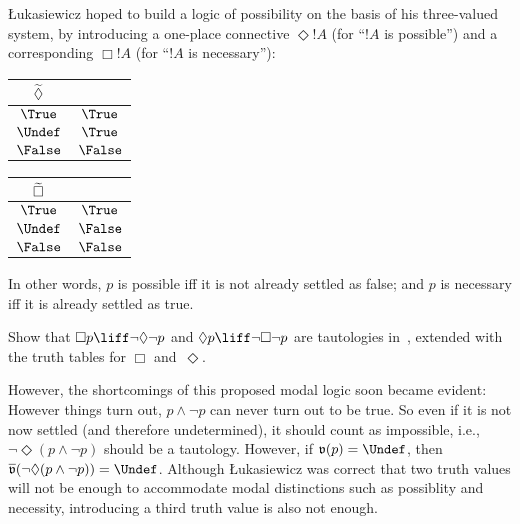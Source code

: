 \documentclass[../../../include/open-logic-section]{subfiles}
\begin{document}
\L ukasiewicz hoped to build a logic of possibility on the basis of his
three-valued system, by introducing a one-place connective $\Diamond
!A$ (for ``$!A$ is possible'') and a corresponding $\Box !A$ (for ``$!A$
is necessary''):
\begin{center}
  \begin{tabular}{c|c} 
    $\tf{\Diamond}$ & \\ 
    \hline  
    $\True$ & $\True$ \\ 
    $\Undef$ & $\True$ \\
    $\False$ & $\False$ 
  \end{tabular}
  \quad
  \begin{tabular}{c|c} 
    $\tf{\Box}$ & \\ 
    \hline  
    $\True$ & $\True$ \\ 
    $\Undef$ & $\False$ \\
    $\False$ & $\False$ 
  \end{tabular}
\end{center}
In other words, $p$ is possible iff it is not already settled as false;
and $p$ is necessary iff it is already settled as true.

\begin{prob}
  Show that $\Box p \liff \lnot\Diamond \lnot p$ and $\Diamond p \liff
  \lnot \Box \lnot p$ are tautologies in~\LogLuk[3], extended with the
  truth tables for $\Box$ and~$\Diamond$.
\end{prob}

However, the shortcomings of this proposed modal logic soon became
evident: However things turn out, $p \land \lnot p$ can never turn out
to be true. So even if it is not now settled (and therefore
undetermined), it should count as impossible, i.e., $\lnot \Diamond(p
\land \lnot p)$ should be a tautology. However, if $\pAssign v(p) =
\Undef$, then $\pValue v(\lnot \Diamond(p \land \lnot p)) =
\Undef$. Although \L ukasiewicz was correct that two truth
values will not be enough to accommodate modal distinctions such as
possiblity and necessity, introducing a third truth value is also not
enough.
\end{document}
